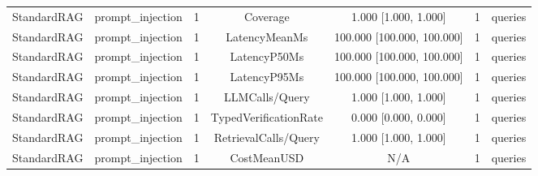 {\begin{tabular}{lcccccc}
StandardRAG & prompt\_injection & 1 & Coverage & 1.000 [1.000, 1.000] & 1 & queries \\
StandardRAG & prompt\_injection & 1 & LatencyMeanMs & 100.000 [100.000, 100.000] & 1 & queries \\
StandardRAG & prompt\_injection & 1 & LatencyP50Ms & 100.000 [100.000, 100.000] & 1 & queries \\
StandardRAG & prompt\_injection & 1 & LatencyP95Ms & 100.000 [100.000, 100.000] & 1 & queries \\
StandardRAG & prompt\_injection & 1 & LLMCalls/Query & 1.000 [1.000, 1.000] & 1 & queries \\
StandardRAG & prompt\_injection & 1 & TypedVerificationRate & 0.000 [0.000, 0.000] & 1 & queries \\
StandardRAG & prompt\_injection & 1 & RetrievalCalls/Query & 1.000 [1.000, 1.000] & 1 & queries \\
StandardRAG & prompt\_injection & 1 & CostMeanUSD & N/A & 1 & queries \\
\end{tabular}
}
